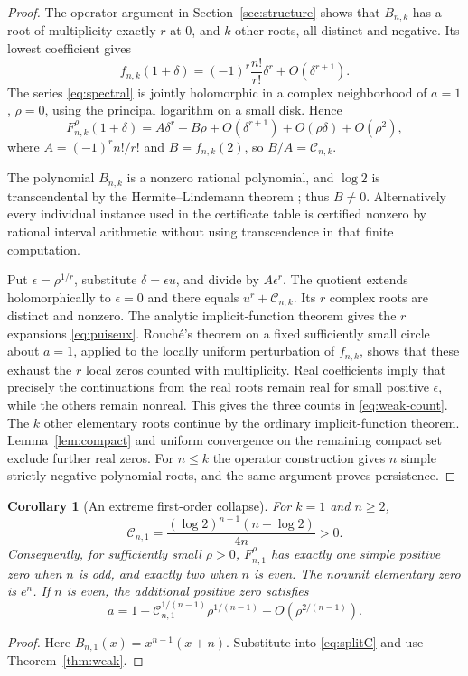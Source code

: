 \documentclass[11pt,letterpaper]{article}
\numberwithin{equation}{section}
\newtheorem{corollary}[theorem]{Corollary}
\theoremstyle{definition}\newtheorem{definition}[theorem]{Definition}
\theoremstyle{remark}\newtheorem{remark}[theorem]{Remark}
\newcommand{\F}[3]{F_{#1,#2}^{#3}}
\begin{document}
\begin{proof}
The operator argument in Section~\ref{sec:structure} shows that $B_{n,k}$ has a root of multiplicity exactly $r$ at $0$, and $k$ other roots, all distinct and negative. Its lowest coefficient gives
\begin{equation}\label{eq:localA}
 f_{n,k}(1+\delta)=(-1)^r\frac{n!}{r!}\delta^r+O(\delta^{r+1}).
\end{equation}
The series \eqref{eq:spectral} is jointly holomorphic in a complex neighborhood of $a=1$, $\rho=0$, using the principal logarithm on a small disk. Hence
\[
 \F nk\rho(1+\delta)
 =A\delta^r+B\rho+O(\delta^{r+1})+O(\rho\delta)+O(\rho^2),
\]
where $A=(-1)^rn!/r!$ and $B=f_{n,k}(2)$, so $B/A=\mathcal C_{n,k}$.

The polynomial $B_{n,k}$ is a nonzero rational polynomial, and $\log2$ is transcendental by the Hermite--Lindemann theorem \cite{lindemann}; thus $B\ne0$. Alternatively every individual instance used in the certificate table is certified nonzero by rational interval arithmetic without using transcendence in that finite computation.

Put $\epsilon=\rho^{1/r}$, substitute $\delta=\epsilon u$, and divide by $A\epsilon^r$. The quotient extends holomorphically to $\epsilon=0$ and there equals $u^r+\mathcal C_{n,k}$. Its $r$ complex roots are distinct and nonzero. The analytic implicit-function theorem gives the $r$ expansions \eqref{eq:puiseux}. Rouch\'e's theorem on a fixed sufficiently small circle about $a=1$, applied to the locally uniform perturbation of $f_{n,k}$, shows that these exhaust the $r$ local zeros counted with multiplicity. Real coefficients imply that precisely the continuations from the real roots remain real for small positive $\epsilon$, while the others remain nonreal. This gives the three counts in \eqref{eq:weak-count}. The $k$ other elementary roots continue by the ordinary implicit-function theorem. Lemma~\ref{lem:compact} and uniform convergence on the remaining compact set exclude further real zeros. For $n\le k$ the operator construction gives $n$ simple strictly negative polynomial roots, and the same argument proves persistence.
\end{proof}

\begin{corollary}[An extreme first-order collapse]\label{cor:k1collapse}
For $k=1$ and $n\ge2$,
\begin{equation}\label{eq:Ck1}
 \mathcal C_{n,1}=\frac{(\log2)^{n-1}(n-\log2)}{4n}>0.
\end{equation}
Consequently, for sufficiently small $\rho>0$, $\F n1\rho$ has exactly one simple positive zero when $n$ is odd, and exactly two when $n$ is even. The nonunit elementary zero is $e^n$. If $n$ is even, the additional positive zero satisfies
\[
 a=1-\mathcal C_{n,1}^{1/(n-1)}\rho^{1/(n-1)}
 +O(\rho^{2/(n-1)}).
\]
\end{corollary}
\begin{proof}
Here $B_{n,1}(x)=x^{n-1}(x+n)$. Substitute into \eqref{eq:splitC} and use Theorem~\ref{thm:weak}.
\end{proof}
\end{document}

